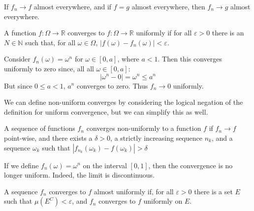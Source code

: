             \begin{theorem}
                If $f_{n}\rightarrow{f}$ almost everywhere, and
                if $f=g$ almost everywhere, then
                $f_{n}\rightarrow{g}$ almost everywhere.
            \end{theorem}
            \begin{definition}
                A function $f:\Omega\rightarrow\mathbb{R}$
                converges to $f:\Omega\rightarrow\mathbb{R}$
                uniformly if for all $\varepsilon>0$ there is
                an $N\in\mathbb{N}$ such that, for all
                $\omega\in\Omega$,
                $|f(\omega)-f_{n}(\omega)|<\varepsilon$.
            \end{definition}
            \begin{example}
                Consider $f_{n}(\omega)=\omega^{n}$ for
                $\omega\in[0,a]$, where $a<1$. Then this
                converges uniformly to zero since, all all
                $\omega\in[0,a]$:
                \begin{equation}
                    |\omega^{n}-0|=\omega^{n}\leq{a}^{n}
                \end{equation}
                But since $0\leq{a}<1$, $a^{n}$ converges to
                zero. Thus $f_{n}\rightarrow{0}$ uniformly.
            \end{example}
            We can define non-uniform converges by considering
            the logical negation of the definition for
            uniform convergence, but we can simplify this as
            well.
            \begin{theorem}
                A sequence of functions $f_{n}$ converges
                non-uniformly to a function $f$ if
                $f_{n}\rightarrow{f}$ point-wise, and there
                exists a $\delta>0$, a strictly increasing
                sequence $n_{k}$, and a sequence $\omega_{k}$
                such that
                $|f_{n_{k}}(\omega_{k})-f(\omega_{k})|>\delta$
            \end{theorem}
            \begin{example}
                If we define $f_{n}(\omega)=\omega^{n}$ on the
                interval $[0,1]$, then the convergence is no
                longer uniform. Indeed, the limit is
                discontinuous.
            \end{example}
            \begin{definition}
                A sequence $f_{n}$ converges to $f$ almost
                uniformly if, for all $\varepsilon>0$ there is
                a set $E$ such that $\mu(E^{C})<\varepsilon$,
                and $f_{n}$ converges to $f$ uniformly on
                $E$.
            \end{definition}
